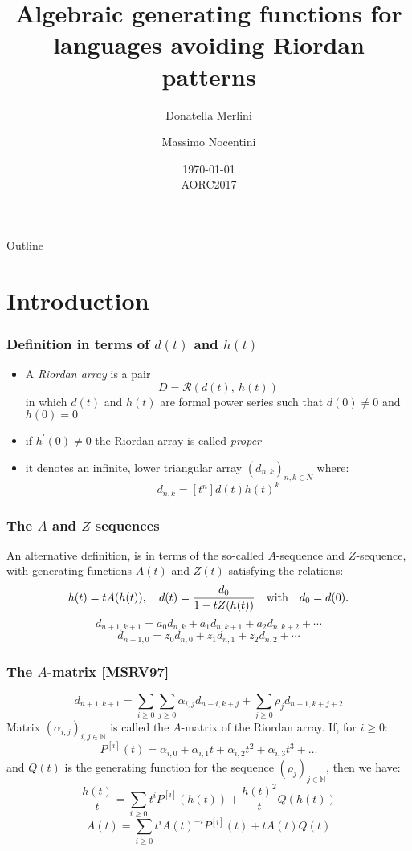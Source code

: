 \documentclass{beamer}
\title[Algebraic gfs for languages avoiding Riordan patterns] %
{Algebraic generating functions for languages  avoiding Riordan patterns}
\author[Merlini, Nocentini] %
{Donatella Merlini \and Massimo Nocentini}
\institute[Universities of Somewhere and Elsewhere] %
{
  Dipartimento di Statistica, Informatica, Applicazioni \\
  University of Florence, Italy
}
\date[Short Occasion] %
{\today \\ AORC2017}
\begin{document}
\begin{frame}
  \titlepage
\end{frame}

\begin{frame}{Outline}
  \tableofcontents
\end{frame}




\section{Introduction}

\begin{frame}
\frametitle{Definition in terms of $d(t)$ and $h(t)$}
\begin{itemize}
\item A \emph{Riordan array} is a pair
$$D=\mathcal{R}(d(t),\ h(t))$$
in which $d(t)$ and $h(t)$ are formal power series such that $d(0)\neq 0$ and  $h(0)= 0$
\item if $h^\prime(0)\neq 0$ the Riordan array is called \emph{proper}
\item it denotes an infinite, lower triangular array $(d_{n,k})_{n,k\in N}$ where:
$$d_{n,k}=[t^n]d(t)h(t)^k$$
\end{itemize}
\end{frame}

\begin{frame}\frametitle{The $A$ and $Z$ sequences}
An alternative definition, is in terms of the so-called $A$-sequence and $Z$-sequence, with generating functions $A(t)$ and $Z(t)$ satisfying
the relations:
$$ h(t)=tA(h(t)), \quad d(t)={d_0\over 1-tZ(h(t))} \quad \mbox{with} \quad d_0=d(0).$$
$$
d_{n+1,k+1}=a_0d_{n,k}+a_1d_{n,k+1}+a_2d_{n,k+2}+\cdots
$$
$$
d_{n+1,0}=z_0d_{n,0}+z_1d_{n,1}+z_2d_{n,2}+\cdots
$$
\end{frame}


\begin{frame}\frametitle{The $A$-matrix {\tiny [MSRV97]}}
$$ d_{n+1,k+1}={\underset{i\geq0}{ \displaystyle\sum }}{\underset{j\geq0}{ \displaystyle\sum }}\alpha_{i,j}d_{n-i,k+j}+ \underset{j\geq
0}{\displaystyle\sum}\rho_jd_{n+1,k+j+2}
$$
Matrix $(\alpha_{i,j})_{i,j\in \mathbb{N}}$  is called the
$A$-matrix of the Riordan array. If,  for $i \geq 0:$
$$P^{[i]}(t)=\alpha_{i,0}+\alpha_{i,1}t+\alpha_{i,2}t^2+\alpha_{i,3}t^3+\ldots$$
 and $Q(t)$ is the generating function for the
sequence $(\rho_j)_{j\in \mathbb{N}}$, then we have:
$$
\dfrac{h(t)}{t}=\underset{i\geq 0}{\displaystyle\sum}t^iP^{[i]}(h(t))+\dfrac{h(t)^{2}}{t}Q(h(t))
$$
$$
A(t) =\underset{i\geq 0}{\displaystyle\sum}t^iA(t)^{-i}P^{[i]}(t)+tA(t)Q(t)
$$
\end{frame}
\end{document}
